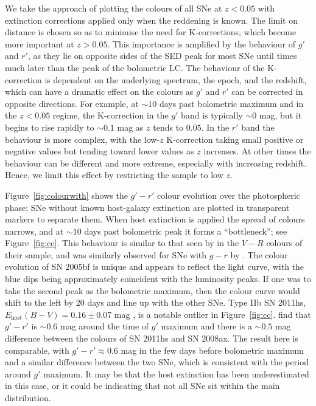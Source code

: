 \documentclass[a4paper,fleqn,usenatbib]{mnras}
\begin{document}
We take the approach of plotting the colours of all SNe at $z<0.05$ with extinction corrections applied only when the reddening is known. The limit on distance is chosen so as to minimise the need for K-corrections, which become more important at $z>0.05$. This importance is amplified by the behaviour of $g'$ and $r'$, as they lie on opposite sides of the SED peak for most SNe until times much later than the peak of the bolometric LC. The behaviour of the K-correction is dependent on the underlying spectrum, the epoch, and the redshift, which can have a dramatic effect on the colours as $g'$ and $r'$ can be corrected in opposite directions. For example, at $\sim 10$ days past bolometric maximum and in the $z < 0.05$ regime, the K-correction in the $g'$ band is typically $\sim 0$ mag, but it begins to rise rapidly to $\sim 0.1$ mag as $z$ tends to 0.05. In the $r'$ band the behaviour is more complex, with the low-$z$ K-correction taking small positive or negative values but tending toward lower values as $z$ increases. At other times the behaviour can be different and more extreme, especially with increasing redshift. Hence, we limit this effect by restricting the sample to low $z$.  

Figure~\ref{fig:colourwith} shows the $g'-r'$ colour evolution over the photospheric phase; SNe without known host-galaxy extinction are plotted in transparent markers to separate them. When host extinction is applied the spread of colours narrows, and at $\sim 10$ days past bolometric peak it forms a ``bottleneck''; see Figure~\ref{fig:cc}. This behaviour is similar to that seen by \cite{Drout2011} in the $V-R$ colours of their sample, and was similarly observed for SNe with $g-r$ by \cite{Taddia2015}. The colour evolution of SN 2005bf is unique and appears to reflect the light curve, with the blue dips being approximately coincident with the luminosity peaks. If one was to take the second peak as the bolometric maximum, then the colour curve would shift to the left by 20 days and line up with the other SNe. Type IIb SN 2011hs, $E_{\mathrm{host}}(B-V) =0.16 \pm0.07$ mag \citep{Bufano2014}, is a notable outlier in Figure~\ref{fig:cc}. \cite{Bufano2014} find that $g'-r'$ is $\sim 0.6$ mag around the time of $g'$ maximum and there is a $\sim 0.5$ mag difference between the colours of SN 2011hs and SN 2008ax. The result here is comparable, with $g'-r' \approx 0.6$ mag in the few days before bolometric maximum and a similar difference between the two SNe, which is consistent with the period around $g'$ maximum. It may be that the host extinction has been underestimated in this case, or it could be indicating that not all SNe sit within the main distribution. 
\end{document}
